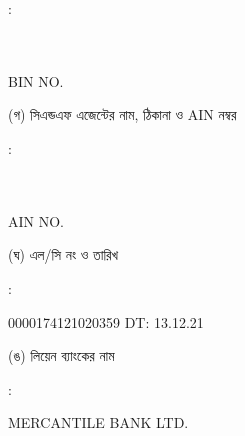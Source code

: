 \documentclass[12pt]{article}
\newcommand{\lcno}{0000174121020359}
\newcommand{\lcdt}{13.12.21}
\newcommand{\lienbank}{MERCANTILE BANK LTD.}
\newcommand{\impn}{\jeal}
\newcommand{\impadd}{\jeala}
\newcommand{\impbin}{\jealbin}
\begin{document}
\begin{minipage}[t]{0.02\linewidth}
:
\end{minipage}
\begin{minipage}[t]{0.53\linewidth}
\textbf{{\impn}}
\\
{\impadd}
\\
BIN NO. {\impbin}
\\
\end{minipage}
\begin{minipage}[t]{0.05\linewidth}
\hspace*{1em}
\end{minipage}
\begin{minipage}[t]{0.40\linewidth}
(গ) সিএন্ডএফ এজেন্টের নাম, ঠিকানা
ও AIN নম্বর
\end{minipage}
\begin{minipage}[t]{0.02\linewidth}
:
\end{minipage}
\begin{minipage}[t]{0.53\linewidth}
\textbf{{\cnfn}}
\\
{\cnfadd}
\\
AIN NO. {\cnfain}
\\
\end{minipage}
\begin{minipage}[t]{0.05\linewidth}
\hspace*{1em}
\end{minipage}
\begin{minipage}[t]{0.40\linewidth}
(ঘ) এল/সি নং ও তারিখ
\end{minipage}
\begin{minipage}[t]{0.02\linewidth}
:
\end{minipage}
\begin{minipage}[t]{0.53\linewidth}
{\lcno} \hspace{2em} DT: {\lcdt}
\\
\end{minipage}
\begin{minipage}[t]{0.05\linewidth}
\hspace*{1em}
\end{minipage}
\begin{minipage}[t]{0.40\linewidth}
(ঙ) লিয়েন ব্যাংকের নাম
\end{minipage}
\begin{minipage}[t]{0.02\linewidth}
:
\end{minipage}
\begin{minipage}[t]{0.53\linewidth}
{\lienbank}
\\
\end{minipage}
\end{document}

